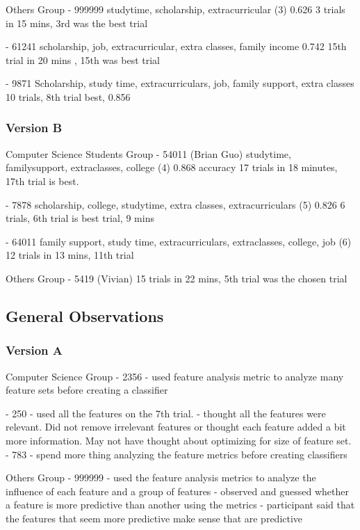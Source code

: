 Others Group
- 999999 
    studytime, scholarship, extracurricular (3)
    0.626
    3 trials in 15 mins, 3rd was the best trial 

- 61241 
    scholarship, job, extracurricular, extra classes, family income
    0.742 
    15th trial in 20 mins , 15th was best trial
    
- 9871
    Scholarship, study time, extracurriculars, job, family support, extra classes
    10 trials, 8th trial best, 
    0.856
    
    
\subsubsection{ Version B }
Computer Science Students Group
- 54011 (Brian Guo)
    studytime, familysupport, extraclasses, college (4)
    0.868 accuracy
    17 trials in 18 minutes, 17th trial is best. 

- 7878 
    scholarship, college, studytime, extra classes, extracurriculars (5)
    0.826
    6 trials, 6th trial is best trial, 9 mins
    
- 64011
    family support,  study time, extracurriculars, extraclasses, college, job (6)
    12 trials in 13 mins, 11th trial


Others Group
- 5419 (Vivian)
    15 trials in 22 mins, 5th trial was the chosen trial
    

\subsection { General Observations }
\subsubsection { Version A }
Computer Science Group 
- 2356 
    - used feature analysis metric to analyze many feature sets before creating a classifier
    
- 250 
    - used all the features on the 7th trial.
    - thought all the features were relevant. Did not remove irrelevant features or thought each feature added a bit more information. May not have thought about optimizing for size of feature set. 
- 783
    - spend more thing analyzing the feature metrics before creating classifiers 

Others Group
- 999999 
    - used the feature analysis metrics to analyze the influence of each feature and a group of features
    - observed and guessed whether a feature is more predictive than another using the metrics
    - participant said that the features that seem more predictive make sense that are predictive
   

